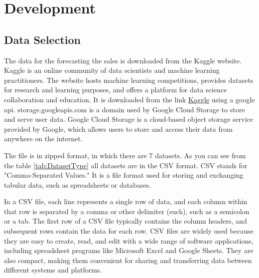 %
%


\chapter{Development}

\section{Data Selection}
The data for the forecasting the sales is downloaded from the Kaggle website. Kaggle is an online community of data scientists and machine learning practitioners. The website hosts machine learning competitions, provides datasets for research and learning purposes, and offers a platform for data science collaboration and education. It is downloaded from the link \href{https://storage.googleapis.com/kaggle-competitions-data/kaggle-v2/7391/44328/bundl}{Kaggle} using a google \ac{api}.  storage.googleapis.com is a domain used by Google Cloud Storage to store and serve user data. Google Cloud Storage is a cloud-based object storage service provided by Google, which allows users to store and access their data from anywhere on the internet.

The file is in zipped format, in which there are 7 datasets.  As you can see from the table \ref{tab:DatasetType} all datasets are in the  CSV format. CSV stands for "Comma-Separated Values." It is a file format used for storing and exchanging tabular data, such as spreadsheets or databases.

In a CSV file, each line represents a single row of data, and each column within that row is separated by a comma or other delimiter (such), such as a semicolon or a tab. The first row of a CSV file typically contains the column headers, and subsequent rows contain the data for each row.
CSV files are widely used because they are easy to create, read, and edit with a wide range of software applications, including spreadsheet programs like Microsoft Excel and Google Sheets. They are also compact, making them convenient for sharing and transferring data between different systems and platforms. 




